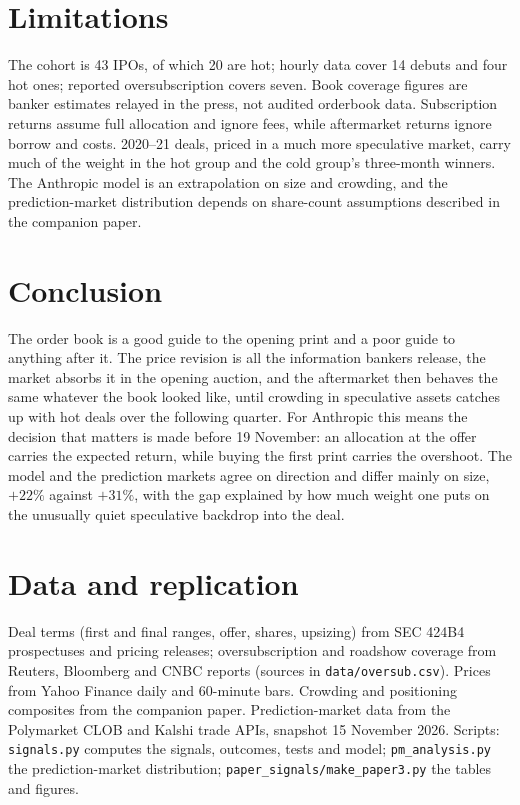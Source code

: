 \documentclass[11pt]{article}
\begin{document}
\section{Limitations}
The cohort is 43 IPOs, of which 20 are hot; hourly data cover 14 debuts and four hot ones; reported oversubscription covers seven. Book coverage figures are banker estimates relayed in the press, not audited orderbook data. Subscription returns assume full allocation and ignore fees, while aftermarket returns ignore borrow and costs. 2020--21 deals, priced in a much more speculative market, carry much of the weight in the hot group and the cold group's three-month winners. The Anthropic model is an extrapolation on size and crowding, and the prediction-market distribution depends on share-count assumptions described in the companion paper.

\section{Conclusion}
The order book is a good guide to the opening print and a poor guide to anything after it. The price revision is all the information bankers release, the market absorbs it in the opening auction, and the aftermarket then behaves the same whatever the book looked like, until crowding in speculative assets catches up with hot deals over the following quarter. For Anthropic this means the decision that matters is made before 19 November: an allocation at the offer carries the expected return, while buying the first print carries the overshoot. The model and the prediction markets agree on direction and differ mainly on size, $+22\%$ against $+31\%$, with the gap explained by how much weight one puts on the unusually quiet speculative backdrop into the deal.




\appendix
\section{Data and replication}
Deal terms (first and final ranges, offer, shares, upsizing) from SEC 424B4 prospectuses and pricing releases; oversubscription and roadshow coverage from Reuters, Bloomberg and CNBC reports (sources in \texttt{data/oversub.csv}). Prices from Yahoo Finance daily and 60-minute bars. Crowding and positioning composites from the companion paper. Prediction-market data from the Polymarket CLOB and Kalshi trade APIs, snapshot 15 November 2026. Scripts: \texttt{signals.py} computes the signals, outcomes, tests and model; \texttt{pm\_analysis.py} the prediction-market distribution; \texttt{paper\_signals/make\_paper3.py} the tables and figures.
\end{document}
